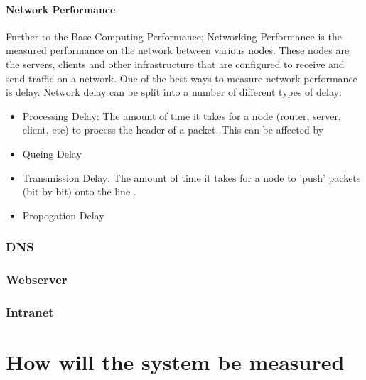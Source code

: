 \subsubsection{Network Performance}
Further to the Base Computing Performance; Networking Performance is the measured performance on the network between various nodes. These nodes are the servers, clients and other infrastructure that are configured to receive and send traffic on a network. One of the best ways to measure network performance is delay. Network delay can be split into a number of different types of delay:
\begin{itemize}
  \item Processing Delay: The amount of time it takes for a node (router, server, client, etc) to process the header of a packet. This can be affected by 
  \item Queing Delay
  \item Transmission Delay: The amount of time it takes for a node to 'push' packets (bit by bit) onto the line \citep{chen2005}. %
  \item Propogation Delay
\end{itemize}


\subsection{DNS}

\subsection{Webserver}

\subsection{Intranet}

\chapter{How will the system be measured}
